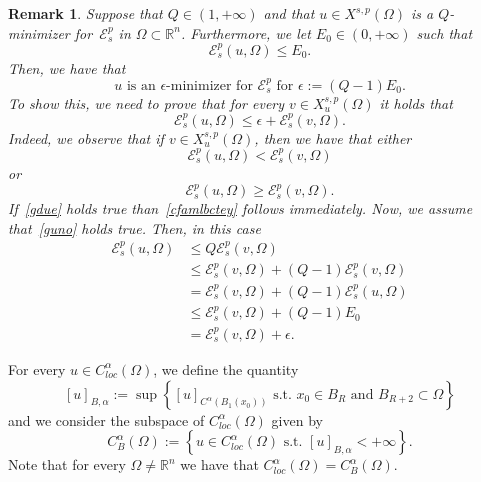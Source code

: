 \documentclass[12pt]{article}
\newcommand{\R}{\mathbb{R}}
\numberwithin{equation}{section}
\newtheorem{rem}[thm]{Remark}
\renewcommand{\leq}{\leqslant}
\renewcommand{\geq}{\geqslant}
\begin{document}
\begin{rem}\label{EnQBo-omnre}
Suppose that $Q\in (1,+\infty)$ and that $u\in X^{s,p}(\Omega)$ is a $Q$-minimizer for~$\mathcal{E}_s^p$ in $\Omega\subset\R^n$. Furthermore, we let $E_0\in (0,+\infty)$ such that 
\begin{equation*}
\mathcal{E}_s^p(u,\Omega)\leq E_0. 
\end{equation*}
Then, we have that 
\begin{equation*}
\mbox{$u$ is an $\epsilon$-minimizer for $\mathcal{E}_s^p$ for  $\epsilon:=(Q-1)E_0$.} 
\end{equation*}
To show this, we need to prove that for every $v\in X_u^{s,p}(\Omega)$ it holds that 
\begin{equation}\label{cfamlbctey}
\mathcal{E}_s^p\left(u,\Omega\right)\leq \epsilon+\mathcal{E}_s^p\left(v,\Omega\right). 
\end{equation}
Indeed, we observe that if $v\in X_u^{s,p}(\Omega)$, then we  have that either 
\begin{equation}\label{gdue}
\mathcal{E}_s^p(u,\Omega)<\mathcal{E}_s^p(v,\Omega)
\end{equation}
or
\begin{equation}\label{guno}
\mathcal{E}_s^p(u,\Omega)\geq \mathcal{E}_s^p(v,\Omega).
\end{equation}
If~\eqref{gdue} holds true than~\eqref{cfamlbctey} follows immediately. Now, we assume that~\eqref{guno} holds true. Then, in this case
\begin{equation*}
\begin{split}
\mathcal{E}_s^p(u,\Omega) &\leq Q\mathcal{E}_s^p(v,\Omega)\\
&\leq \mathcal{E}_s^p(v,\Omega)+(Q-1)\mathcal{E}_s^p(v,\Omega)\\
&=\mathcal{E}_s^p(v,\Omega)+(Q-1)\mathcal{E}_s^p(u,\Omega)\\
&\leq \mathcal{E}_s^p(v,\Omega)+(Q-1)E_0\\
&=\mathcal{E}_s^p(v,\Omega)+\epsilon.
\end{split}
\end{equation*}
\end{rem}
For every $u\in C_{\textit{loc}}^\alpha(\Omega)$, we define the quantity 
\begin{equation}\label{gliorteitbergf}
\left[u\right]_{B,\alpha}:=\sup\left\lbrace \left[u\right]_{C^\alpha (B_1(x_0))}\mbox{  s.t.  } x_0\in B_R\mbox{ and }B_{R+2}\subset \Omega \right\rbrace
\end{equation}
and we consider the subspace of $C_{\textit{loc}}^\alpha(\Omega)$ given by 
\begin{equation*}
C_B^\alpha(\Omega):=\left\lbrace u\in C_{\textit{loc}}^\alpha(\Omega)\mbox{  s.t.  } \left[u\right]_{B,\alpha}<+\infty \right\rbrace.
\end{equation*}
Note that for every $\Omega\neq \R^n$  we have that $C_{\textit{loc}}^\alpha(\Omega)=C_B^\alpha(\Omega)$. 
\end{document}
